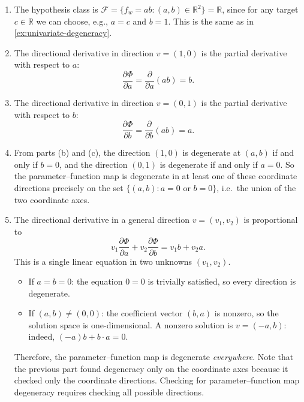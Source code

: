 \documentclass[11pt]{article}
\newcommand{\R}{\mathbb{R}}
\newcommand{\F}{\mathcal{F}}
\begin{document}
\begin{solution}
\begin{enumerate}
    \item The hypothesis class is $\F = \{f_w = ab : (a, b) \in \R^2\} = \R$, since for any target $c \in \R$ we can choose, e.g., $a = c$ and $b = 1$. This is the same as in \cref{ex:univariate-degeneracy}.

    \item The directional derivative in direction $v = (1, 0)$ is the partial derivative with respect to $a$:
    \begin{equation*}
        \frac{\partial \Phi}{\partial a} = \frac{\partial}{\partial a}(ab) = b.
    \end{equation*}

    \item The directional derivative in direction $v = (0, 1)$ is the partial derivative with respect to $b$:
    \begin{equation*}
        \frac{\partial \Phi}{\partial b} = \frac{\partial}{\partial b}(ab) = a.
    \end{equation*}

    \item From parts (b) and (c), the direction $(1, 0)$ is degenerate at $(a, b)$ if and only if $b = 0$, and the direction $(0, 1)$ is degenerate if and only if $a = 0$. So the parameter--function map is degenerate in at least one of these coordinate directions precisely on the set $\{(a, b) : a = 0 \text{ or } b = 0\}$, i.e.\ the union of the two coordinate axes.

    \item The directional derivative in a general direction $v = (v_1, v_2)$ is proportional to
    \begin{equation*}
        v_1 \frac{\partial \Phi}{\partial a} + v_2 \frac{\partial \Phi}{\partial b} = v_1 b + v_2 a.
    \end{equation*}
    This is a single linear equation in two unknowns $(v_1, v_2)$.
    \begin{itemize}
        \item If $a = b = 0$: the equation $0 = 0$ is trivially satisfied, so every direction is degenerate.
        \item If $(a, b) \neq (0, 0)$: the coefficient vector $(b, a)$ is nonzero, so the solution space is one-dimensional. A nonzero solution is $v = (-a, b)$: indeed, $(-a) b + b \cdot a = 0$.
    \end{itemize}
    Therefore, the parameter--function map is degenerate \emph{everywhere}.
    Note that the previous part found degeneracy only on the coordinate axes
    because it checked only the coordinate directions. Checking for
    parameter--function map degeneracy requires checking all possible
    directions.
    \qedhere
\end{enumerate}
\end{solution}
\end{document}
